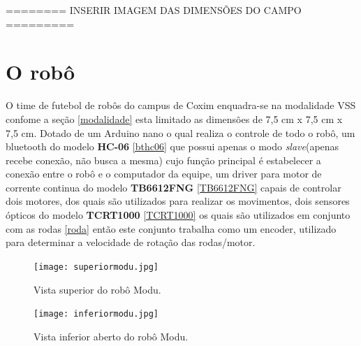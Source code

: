 \documentclass[a4paper,12pt,portuguese]{ufms-cpcx}
\begin{document}
======== INSERIR IMAGEM DAS DIMENSÕES DO CAMPO =========

\chapter{O robô}
O time de futebol de robôs do campus de Coxim enquadra-se na modalidade VSS confome a seção \ref{modalidade} esta limitado as dimensões de 7,5 cm x 7,5 cm x 7,5 cm. Dotado de um Arduino nano o qual realiza o controle de todo o robô, um bluetooth do modelo \textbf{HC-06} \ref{bthc06} que possui apenas o modo \textit{slave}(apenas recebe conexão, não busca a mesma) cujo função principal é estabelecer a conexão entre o robô e o computador da equipe, um driver para motor de corrente continua do modelo \textbf{TB6612FNG} \ref{TB6612FNG} capais de controlar dois motores, dos quais são utilizados para realizar os movimentos, dois sensores ópticos do modelo \textbf{TCRT1000} \ref{TCRT1000} os quais são utilizados em conjunto com as rodas \ref{roda} então este conjunto trabalha como um encoder, utilizado para determinar a velocidade de rotação das rodas/motor.
\begin{figure}[H]
	\centering
	\texttt{[image: superiormodu.jpg]}
	\caption{Vista superior do robô Modu.}
\end{figure}
\begin{figure}[H]
	\centering
	\texttt{[image: inferiormodu.jpg]}
	\caption{Vista inferior aberto do robô Modu.}
\end{figure}
\end{document}
